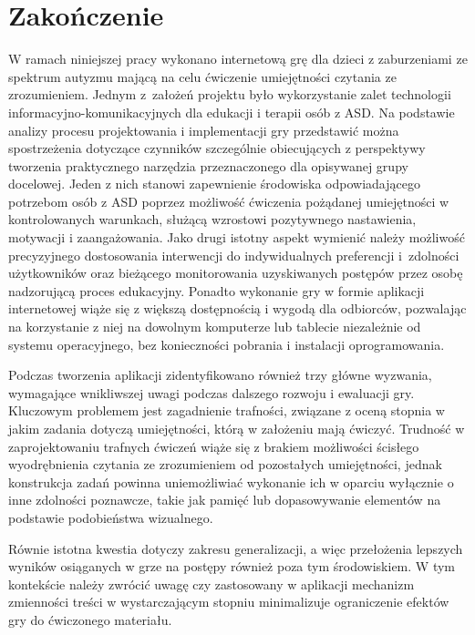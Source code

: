 \chapter{Zakończenie}
\thispagestyle{firststyle}

W ramach niniejszej pracy wykonano internetową grę dla dzieci z zaburzeniami ze spektrum autyzmu mającą na celu ćwiczenie umiejętności czytania ze zrozumieniem.
Jednym z~założeń projektu było wykorzystanie zalet technologii informacyjno-komunikacyjnych dla edukacji i terapii osób z ASD.
Na podstawie analizy procesu projektowania i implementacji gry przedstawić można spostrzeżenia dotyczące czynników szczególnie obiecujących z perspektywy tworzenia praktycznego narzędzia przeznaczonego dla opisywanej grupy docelowej.
Jeden z nich stanowi zapewnienie środowiska odpowiadającego potrzebom osób z ASD poprzez możliwość ćwiczenia pożądanej umiejętności w kontrolowanych warunkach, służącą wzrostowi pozytywnego nastawienia, motywacji i zaangażowania.
Jako drugi istotny aspekt wymienić należy możliwość precyzyjnego dostosowania interwencji do indywidualnych preferencji i~zdolności użytkowników oraz bieżącego monitorowania uzyskiwanych postępów przez osobę nadzorującą proces edukacyjny.
Ponadto wykonanie gry w formie aplikacji internetowej wiąże się z większą dostępnością i wygodą dla odbiorców, pozwalając na korzystanie z niej na dowolnym komputerze lub tablecie niezależnie od systemu operacyjnego, bez konieczności pobrania i instalacji oprogramowania.

Podczas tworzenia aplikacji zidentyfikowano również trzy główne wyzwania, wymagające wnikliwszej uwagi podczas dalszego rozwoju i ewaluacji gry.
Kluczowym problemem jest zagadnienie trafności, związane z oceną stopnia w jakim zadania dotyczą umiejętności, którą w założeniu mają ćwiczyć.
Trudność w zaprojektowaniu trafnych ćwiczeń wiąże się z brakiem możliwości ścisłego wyodrębnienia czytania ze zrozumieniem od pozostałych umiejętności, jednak konstrukcja zadań powinna uniemożliwiać wykonanie ich w oparciu wyłącznie o inne zdolności poznawcze, takie jak pamięć lub dopasowywanie elementów na podstawie podobieństwa wizualnego.

Równie istotna kwestia dotyczy zakresu generalizacji, a więc przełożenia lepszych wyników osiąganych w grze na postępy również poza tym środowiskiem.
W tym kontekście należy zwrócić uwagę czy zastosowany w aplikacji mechanizm zmienności treści w wystarczającym stopniu minimalizuje ograniczenie efektów gry do ćwiczonego materiału.

